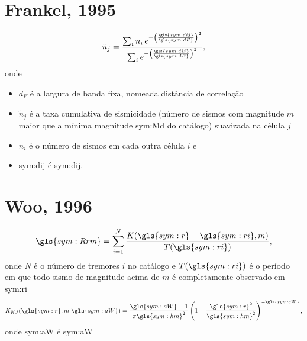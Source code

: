 \documentclass[final]{beamer}
\begin{document}
\begin{poster}
\newcolumn

\section{Frankel, 1995}

\begin{equation}
	\ensuremath{
		\tilde{n}_j = \frac{ \sum_{i} n_i \,e^{ - \left(\frac{\gls{sym:dij}}{\gls{sym:dF}}\right)^2}}
						   { \sum_{i}     e^{ - \left(\frac{\gls{sym:dij}}{\gls{sym:dF}}\right)^2}},
	}
	\label{eq:ni}
\end{equation}
\footnotesize
onde 
\begin{itemize}
	\item $d_F$ é a largura de banda \alert{fixa}, nomeada distância de
	correlação
	\item $\tilde{n}_j$ é a taxa cumulativa de sismicidade (número de sismos com magnitude
	$m$ maior que a mínima magnitude \gls{sym:Md} do catálogo) suavizada na célula $j$
	\item $n_i$ é o número de sismos em cada outra célula $i$ e
	\item \gls{sym:dij} é \glsdesc{sym:dij}.
\end{itemize}
\item 

\section{Woo, 1996}
\small
		\begin{equation}
			\ensuremath{
				\gls{sym:Rrm} = \sum_{i=1}^{N} \frac{ K(\gls{sym:r} - \gls{sym:ri}, m)}
													{T({\gls{sym:ri})}},
			}
			\label{eq:Rrm}
		\end{equation}
\footnotesize
	onde $N$ é o número de tremores $i$ no catálogo 
	e $T(\gls{sym:ri})$ é o período em que todo sismo de magnitude acima de $m$ é completamente observado 
	em \gls{sym:ri}
\small
		\begin{equation}
			\ensuremath{
				K_{KJ}(\gls{sym:r}, m \arrowvert \gls{sym:aW}) =  \frac{  \gls{sym:aW}  -1}{\pi\gls{sym:hm}^2}
									\left( 1 + \frac{\gls{sym:r}^2}{\gls{sym:hm}^2} \right)^{-\gls{sym:aW}},
			}
			\label{eq:k_kj}
		\end{equation}
\footnotesize
	onde \gls{sym:aW} é \glsdesc{sym:aW}



\end{poster}
\end{document}

